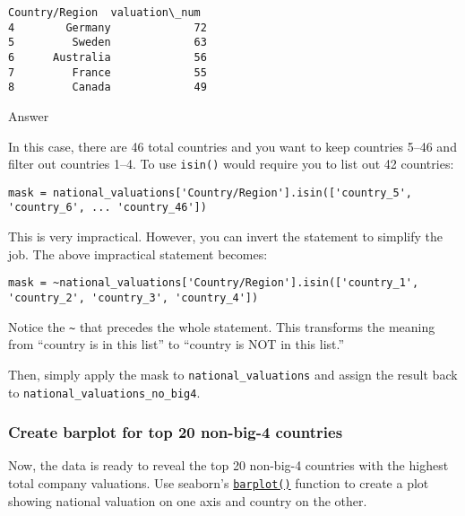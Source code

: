 \documentclass[11pt]{article}
\makeatletter
\newcommand{\boxspacing}{\kern\kvtcb@left@rule\kern\kvtcb@boxsep}
\newcommand{\prompt}[4]{
        \ttfamily\llap{{\color{#2}[#3]:\hspace{3pt}#4}}\vspace{-\baselineskip}
    }
\makeatother
\begin{document}
            \begin{tcolorbox}[breakable, size=fbox, boxrule=.5pt, pad at break*=1mm, opacityfill=0]
\prompt{Out}{outcolor}{22}{\boxspacing}
\begin{Verbatim}[commandchars=\\\{\}]
  Country/Region  valuation\_num
4        Germany             72
5         Sweden             63
6      Australia             56
7         France             55
8         Canada             49
\end{Verbatim}
\end{tcolorbox}
        
    Answer

In this case, there are 46 total countries and you want to keep
countries 5--46 and filter out countries 1--4. To use \texttt{isin()}
would require you to list out 42 countries:

\begin{verbatim}
mask = national_valuations['Country/Region'].isin(['country_5', 'country_6', ... 'country_46'])
\end{verbatim}

This is very impractical. However, you can invert the statement to
simplify the job. The above impractical statement becomes:

\begin{verbatim}
mask = ~national_valuations['Country/Region'].isin(['country_1', 'country_2', 'country_3', 'country_4'])
\end{verbatim}

Notice the \texttt{\textasciitilde{}} that precedes the whole statement.
This transforms the meaning from ``country is in this list'' to
``country is NOT in this list.''

Then, simply apply the mask to \texttt{national\_valuations} and assign
the result back to \texttt{national\_valuations\_no\_big4}.

    \hypertarget{create-barplot-for-top-20-non-big-4-countries}{%
\subsubsection{Create barplot for top 20 non-big-4
countries}\label{create-barplot-for-top-20-non-big-4-countries}}

    Now, the data is ready to reveal the top 20 non-big-4 countries with the
highest total company valuations. Use seaborn's
\href{https://seaborn.pydata.org/generated/seaborn.barplot.html}{\texttt{barplot()}}
function to create a plot showing national valuation on one axis and
country on the other.
\end{document}
